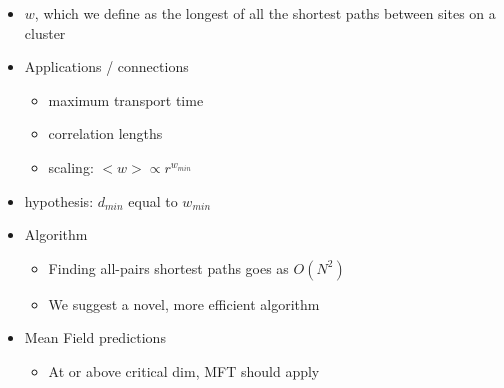\documentclass[11pt]{article}
\begin{document}
\begin{itemize}

\item $w$, which we define as the longest of all the shortest paths between sites on a cluster\\
\label{sec-4.1.3.1}


\item Applications / connections\\
\label{sec-4.1.3.2}

\begin{itemize}

\item maximum transport time\\
\label{sec-4.1.3.2.1}


\item correlation lengths\\
\label{sec-4.1.3.2.2}


\item scaling: $< w > \propto r^{w_{min}}$\\
\label{sec-4.1.3.2.3}

\end{itemize} %

\item hypothesis: $d_{min}$ equal to $w_{min}$\\
\label{sec-4.1.3.3}


\item Algorithm\\
\label{sec-4.1.3.4}

\begin{itemize}

\item Finding all-pairs shortest paths goes as $O(N^2)$\\
\label{sec-4.1.3.4.1}


\item We suggest a novel, more efficient algorithm\\
\label{sec-4.1.3.4.2}

\end{itemize} %

\item Mean Field predictions\\
\label{sec-4.1.3.5}

\begin{itemize}

\item At or above critical dim, MFT should apply\\
\label{sec-4.1.3.5.1}



\end{itemize}
\end{itemize}
\end{document}
